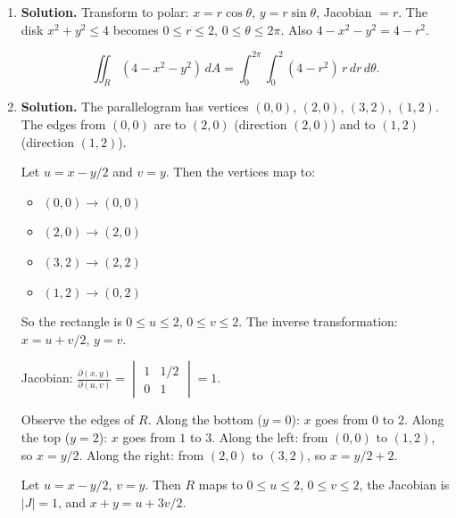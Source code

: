 \begin{enumerate}
With $\rho(x,y,z) = 3x = 3\rho\sin\phi\cos\theta$:

\begin{align*}
I &= \int_0^{\pi/2}\int_0^{\pi/2}\int_0^3 3\rho\sin\phi\cos\theta\cdot\rho^2\sin\phi\,d\rho\,d\phi\,d\theta \\
&= 3\int_0^{\pi/2}\cos\theta\,d\theta\int_0^{\pi/2}\sin^2\phi\,d\phi\int_0^3\rho^3\,d\rho.
\end{align*}

\[
= 3\cdot[\sin\theta]_0^{\pi/2}\cdot\frac{\pi}{4}\cdot\frac{81}{4} = 3\cdot 1\cdot\frac{\pi}{4}\cdot\frac{81}{4} = \boxed{\frac{243\pi}{16}}.
\]

\item \textbf{Solution.}
Transform to polar: $x = r\cos\theta$, $y = r\sin\theta$, Jacobian $= r$. The disk $x^2+y^2\le 4$ becomes $0\le r\le 2$, $0\le\theta\le 2\pi$. Also $4-x^2-y^2 = 4-r^2$.

\[
\boxed{\iint_R(4-x^2-y^2)\,dA = \int_0^{2\pi}\int_0^2(4-r^2)\,r\,dr\,d\theta}.
\]

\item \textbf{Solution.}
The parallelogram has vertices $(0,0)$, $(2,0)$, $(3,2)$, $(1,2)$. The edges from $(0,0)$ are to $(2,0)$ (direction $(2,0)$) and to $(1,2)$ (direction $(1,2)$).

Let $u = x - y/2$ and $v = y$. Then the vertices map to:
\begin{itemize}
\item $(0,0)\to(0,0)$
\item $(2,0)\to(2,0)$
\item $(3,2)\to(2,2)$
\item $(1,2)\to(0,2)$
\end{itemize}

So the rectangle is $0\le u\le 2$, $0\le v\le 2$. The inverse transformation: $x = u+v/2$, $y = v$.

Jacobian: $\frac{\partial(x,y)}{\partial(u,v)} = \begin{vmatrix} 1 & 1/2 \\ 0 & 1\end{vmatrix} = 1$.

Observe the edges of $R$. Along the bottom ($y=0$): $x$ goes from $0$ to $2$. Along the top ($y=2$): $x$ goes from $1$ to $3$. Along the left: from $(0,0)$ to $(1,2)$, so $x = y/2$. Along the right: from $(2,0)$ to $(3,2)$, so $x = y/2+2$.

Let $u = x - y/2$, $v = y$. Then $R$ maps to $0\le u\le 2$, $0\le v\le 2$, the Jacobian is $|J| = 1$, and $x + y = u + 3v/2$.


\end{enumerate}
